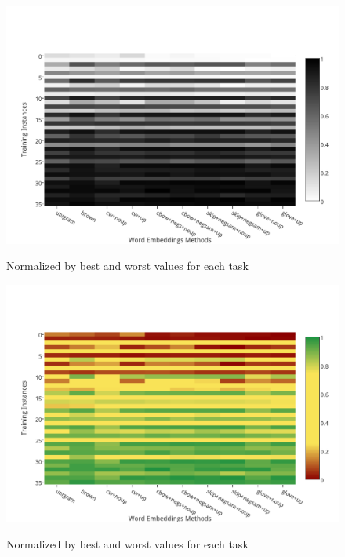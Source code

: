 \begin{figure}
\caption{Normalized by best and worst values for each task}
\centering
\includegraphics[scale=0.8]{plots/heat-map}    	
\label{fig:heatmap}
\end{figure}

\begin{figure}
\caption{Normalized by best and worst values for each task}
\centering
\includegraphics[scale=0.8]{plots/heat-map-color}    	
\label{fig:heatmap}
\end{figure}



